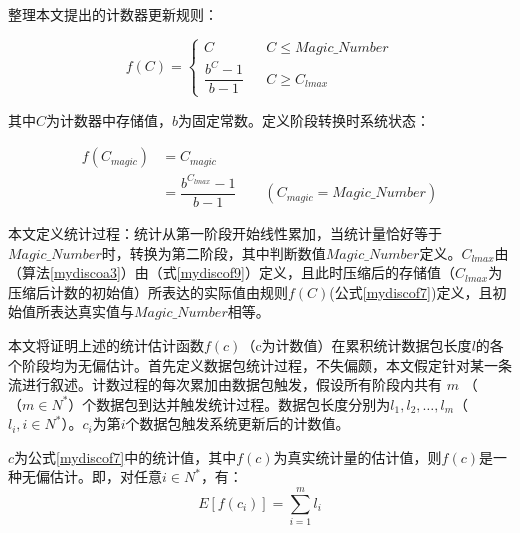 整理本文提出的计数器更新规则：

\begin{equation} \label{mydiscof7}
 f(C)=\left\{
\begin{array}{rcl}
C         &      & {C \leq Magic\_Number} \\
\dfrac{b^C-1}{b-1}       &      & {C \geq C_{lmax}}
\end{array} \right. 
\end{equation}

其中$ C $为计数器中存储值，$ b $为固定常数。定义阶段转换时系统状态：


\begin{align}\label{mydiscof9}
f(C_{magic}) &= C_{magic} \nonumber \\
&=\dfrac{b^{C_{lmax}}-1}{b-1} \quad\quad (C_{magic} = Magic\_Number)
\end{align}

本文定义统计过程：统计从第一阶段开始线性累加，当统计量恰好等于$ Magic\_Number $时，转换为第二阶段，其中判断数值$ Magic\_Number $定义。$ C_{lmax} $由（算法\ref{mydiscoa3}）由（式\ref{mydiscof9}）定义，且此时压缩后的存储值（$ C_{lmax} $为压缩后计数的初始值）所表达的实际值由规则$f(C)$(公式\ref{mydiscof7})定义，且初始值所表达真实值与$ Magic\_Number $相等。

本文将证明上述的统计估计函数$f(c)$（c为计数值）在累积统计数据包长度$l$的各个阶段均为无偏估计。首先定义数据包统计过程，不失偏颇，本文假定针对某一条流进行叙述。计数过程的每次累加由数据包触发，假设所有阶段内共有 $ m $ （ $（m\in N^{\ast} $）个数据包到达并触发统计过程。数据包长度分别为$l_1,l_2,\dots,l_m$（$ l_i,i\in N^{\ast} $）。$ c_i $为第$ i $个数据包触发系统更新后的计数值。

\begin{theorem}%
	$ c $为公式\ref{mydiscof7}中的统计值，其中$ f(c) $为真实统计量的估计值，则$ f(c) $是一种无偏估计。即，对任意$ i\in N^{\ast} $，有：
\begin{equation} \label{mydiscof8}
E[f(c_i)]=\sum ^{m}_{i=1}l_{i}
\end{equation}	
\end{theorem}

